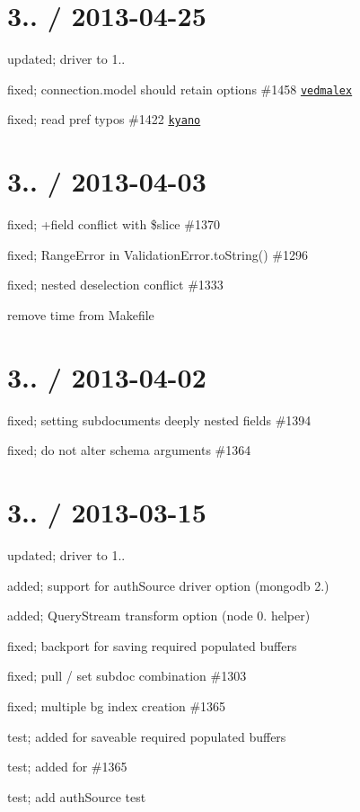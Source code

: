 \section*{3.. / 2013-\/04-\/25 }


\begin{DoxyItemize}
\item updated; driver to 1..
\item fixed; connection.\+model should retain options \#1458 \href{https://github.com/vedmalex}{\tt vedmalex}
\item fixed; read pref typos \#1422 \href{https://github.com/kyano}{\tt kyano}
\end{DoxyItemize}

\section*{3.. / 2013-\/04-\/03 }


\begin{DoxyItemize}
\item fixed; +field conflict with \$slice \#1370
\item fixed; Range\+Error in Validation\+Error.\+to\+String() \#1296
\item fixed; nested deselection conflict \#1333
\item remove time from Makefile
\end{DoxyItemize}

\section*{3.. / 2013-\/04-\/02 }


\begin{DoxyItemize}
\item fixed; setting subdocuments deeply nested fields \#1394
\item fixed; do not alter schema arguments \#1364
\end{DoxyItemize}

\section*{3.. / 2013-\/03-\/15 }


\begin{DoxyItemize}
\item updated; driver to 1..
\item added; support for auth\+Source driver option (mongodb 2.)
\item added; Query\+Stream transform option (node 0. helper)
\item fixed; backport for saving required populated buffers
\item fixed; pull / set subdoc combination \#1303
\item fixed; multiple bg index creation \#1365
\item test; added for saveable required populated buffers
\item test; added for \#1365
\item test; add auth\+Source test
\end{DoxyItemize}

